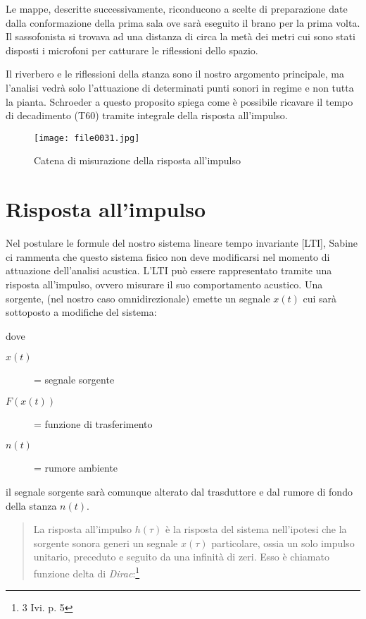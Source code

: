Le mappe, descritte successivamente, riconducono a scelte di preparazione date dalla conformazione della
prima sala ove sarà eseguito il brano per la prima volta. Il sassofonista si trovava ad una
distanza di circa la metà dei metri cui sono stati disposti i microfoni per catturare le  riflessioni dello spazio.	

Il riverbero e le riflessioni della stanza sono il nostro argomento principale, ma l'analisi vedrà solo
l'attuazione di determinati punti sonori in regime e non tutta la pianta.
Schroeder a questo proposito spiega come %
è possibile ricavare il tempo di decadimento (T60) tramite integrale della risposta all'impulso.

\begin{figure}
\centering
{\texttt{[image: file0031.jpg]}}
\caption[Pianta S. Luca]{Catena di misurazione della risposta all'impulso}
\label{fig:tetratetra}
\end{figure}

\section{Risposta all'impulso}

Nel postulare le formule del nostro sistema lineare tempo invariante [LTI], Sabine ci rammenta
che questo sistema fisico  non deve  modificarsi nel momento di attuazione dell'analisi acustica.
L'LTI può essere rappresentato tramite una risposta all'impulso, ovvero misurare il suo
comportamento acustico.  Una sorgente, (nel nostro caso omnidirezionale) emette un
segnale $x(t)$  cui sarà sottoposto a modifiche del sistema:

dove

\begin{description}
	\item[$x(t)$] = segnale sorgente 
	\item[$F(x(t))$] = funzione di trasferimento
	\item[$n(t)$] = rumore ambiente
\end{description}

il segnale sorgente sarà comunque alterato dal trasduttore e dal rumore di fondo della stanza $n(t)$.

\begin{quote}

La risposta all'impulso $h(\tau)$ è la risposta del sistema nell'ipotesi che la
sorgente sonora generi un segnale $x(\tau)$ particolare, ossia un solo impulso unitario,
preceduto e seguito da una infinità di zeri. Esso è chiamato funzione delta di \emph{Dirac}:\footnote{3 Ivi. p. 5} 

\end{quote}

